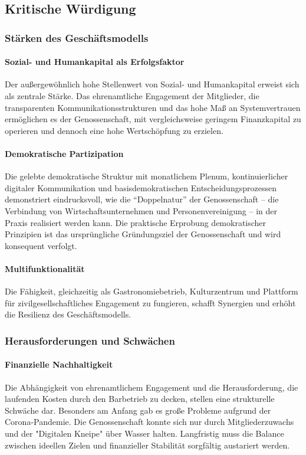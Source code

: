 \subsection{Kritische Würdigung}

\subsubsection{Stärken des Geschäftsmodells}

\paragraph{Sozial- und Humankapital als Erfolgsfaktor}
Der außergewöhnlich hohe Stellenwert von Sozial- und Humankapital erweist sich als zentrale Stärke. Das ehrenamtliche Engagement der Mitglieder, die transparenten Kommunikationsstrukturen und das hohe Maß an Systemvertrauen ermöglichen es der Genossenschaft, mit vergleichsweise geringem Finanzkapital zu operieren und dennoch eine hohe Wertschöpfung zu erzielen.

\paragraph{Demokratische Partizipation}
Die gelebte demokratische Struktur mit monatlichem Plenum, kontinuierlicher digitaler Kommunikation und basisdemokratischen Entscheidungsprozessen demonstriert eindrucksvoll, wie die \enquote{Doppelnatur} der Genossenschaft – die Verbindung von Wirtschaftsunternehmen und Personenvereinigung – in der Praxis realisiert werden kann. Die praktische Erprobung demokratischer Prinzipien ist das ursprüngliche Gründungsziel der Genossenschaft und wird konsequent verfolgt.

\paragraph{Multifunktionalität}
Die Fähigkeit, gleichzeitig als Gastronomiebetrieb, Kulturzentrum und Plattform für zivilgesellschaftliches Engagement zu fungieren, schafft Synergien und erhöht die Resilienz des Geschäftsmodells.

\subsubsection{Herausforderungen und Schwächen}

\paragraph{Finanzielle Nachhaltigkeit}
Die Abhängigkeit von ehrenamtlichem Engagement und die Herausforderung, die laufenden Kosten durch den Barbetrieb zu decken, stellen eine strukturelle Schwäche dar. Besonders am Anfang gab es große Probleme aufgrund der Corona-Pandemie. Die Genossenschaft konnte sich nur durch Mitgliederzuwachs und der "Digitalen Kneipe" über Wasser halten. Langfristig muss die Balance zwischen ideellen Zielen und finanzieller Stabilität sorgfältig austariert werden.

